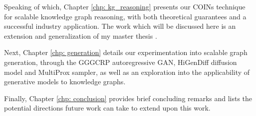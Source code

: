 Speaking of which, Chapter \ref{chp: kg_reasoning} presents our COINs technique for scalable knowledge graph reasoning, with both theoretical guarantees and a successful industry application. The work which will be discussed here is an extension and generalization of my master thesis \cite{janchevski_graph_2021}.

Next, Chapter \ref{chp: generation} details our experimentation into scalable graph generation, through the GGGCRP autoregressive GAN, HiGenDiff diffusion model and MultiProx sampler, as well as an exploration into the applicability of generative models to knowledge graphs. 

Finally, Chapter \ref{chp: conclusion} provides brief concluding remarks and lists the potential directions future work can take to extend upon this work.